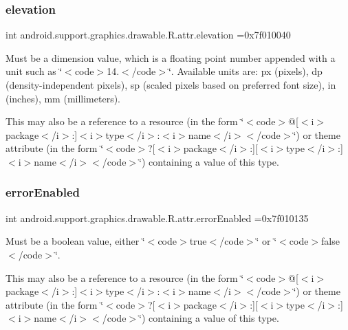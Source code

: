 \subsubsection{\texorpdfstring{elevation}{elevation}}
{\footnotesize\ttfamily int android.\+support.\+graphics.\+drawable.\+R.\+attr.\+elevation =0x7f010040\hspace{0.3cm}{\ttfamily [static]}}

Must be a dimension value, which is a floating point number appended with a unit such as \char`\"{}$<$code$>$14.\+5sp$<$/code$>$\char`\"{}. Available units are\+: px (pixels), dp (density-\/independent pixels), sp (scaled pixels based on preferred font size), in (inches), mm (millimeters). 

This may also be a reference to a resource (in the form \char`\"{}$<$code$>$@\mbox{[}$<$i$>$package$<$/i$>$\+:\mbox{]}$<$i$>$type$<$/i$>$\+:$<$i$>$name$<$/i$>$$<$/code$>$\char`\"{}) or theme attribute (in the form \char`\"{}$<$code$>$?\mbox{[}$<$i$>$package$<$/i$>$\+:\mbox{]}\mbox{[}$<$i$>$type$<$/i$>$\+:\mbox{]}$<$i$>$name$<$/i$>$$<$/code$>$\char`\"{}) containing a value of this type. \mbox{\label{classandroid_1_1support_1_1graphics_1_1drawable_1_1R_1_1attr_ac51b6cc60d1aadf75b34d5f9e6504967}} 
\subsubsection{\texorpdfstring{error\+Enabled}{errorEnabled}}
{\footnotesize\ttfamily int android.\+support.\+graphics.\+drawable.\+R.\+attr.\+error\+Enabled =0x7f010135\hspace{0.3cm}{\ttfamily [static]}}

Must be a boolean value, either \char`\"{}$<$code$>$true$<$/code$>$\char`\"{} or \char`\"{}$<$code$>$false$<$/code$>$\char`\"{}. 

This may also be a reference to a resource (in the form \char`\"{}$<$code$>$@\mbox{[}$<$i$>$package$<$/i$>$\+:\mbox{]}$<$i$>$type$<$/i$>$\+:$<$i$>$name$<$/i$>$$<$/code$>$\char`\"{}) or theme attribute (in the form \char`\"{}$<$code$>$?\mbox{[}$<$i$>$package$<$/i$>$\+:\mbox{]}\mbox{[}$<$i$>$type$<$/i$>$\+:\mbox{]}$<$i$>$name$<$/i$>$$<$/code$>$\char`\"{}) containing a value of this type. \mbox{\label{classandroid_1_1support_1_1graphics_1_1drawable_1_1R_1_1attr_a0c0168ca97ec7222d505e2b4c8206b28}} 

